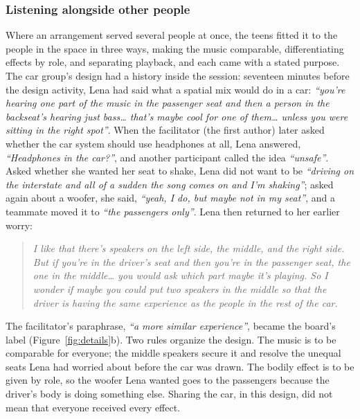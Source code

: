 \subsubsection{Listening alongside other people}

Where an arrangement served several people at once, the teens fitted it to the people in the space in three ways, making the music comparable, differentiating effects by role, and separating playback, and each came with a stated purpose. The car group's design had a history inside the session: seventeen minutes before the design activity, Lena had said what a spatial mix would do in a car: \textit{``you're hearing one part of the music in the passenger seat and then a person in the backseat's hearing just bass\ldots{} that's maybe cool for one of them\ldots{} unless you were sitting in the right spot''}. When the facilitator (the first author) later asked whether the car system should use headphones at all, Lena answered, \textit{``Headphones in the car?''}, and another participant called the idea \textit{``unsafe''}. Asked whether she wanted her seat to shake, Lena did not want to be \textit{``driving on the interstate and all of a sudden the song comes on and I'm shaking''}; asked again about a woofer, she said, \textit{``yeah, I do, but maybe not in my seat''}, and a teammate moved it to \textit{``the passengers only''}. Lena then returned to her earlier worry:

\begin{quote}
\textit{I like that there's speakers on the left side, the middle, and the right side. But if you're in the driver's seat and then you're in the passenger seat, the one in the middle\ldots{} you would ask which part maybe it's playing. So I wonder if maybe you could put two speakers in the middle so that the driver is having the same experience as the people in the rest of the car.}
\end{quote}

The facilitator's paraphrase, \textit{``a more similar experience''}, became the board's label (Figure~\ref{fig:details}b). Two rules organize the design. The music is to be comparable for everyone; the middle speakers secure it and resolve the unequal seats Lena had worried about before the car was drawn. The bodily effect is to be given by role, so the woofer Lena wanted goes to the passengers because the driver's body is doing something else. Sharing the car, in this design, did not mean that everyone received every effect.

